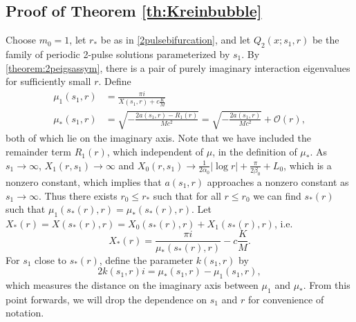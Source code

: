 \documentclass[10pt,reqno]{amsart}
\theoremstyle{plain}
\theoremstyle{definition}
\theoremstyle{remark}
\numberwithin{theorem}{section}
\numberwithin{equation}{section}
\begin{document}
\subsection{Proof of Theorem \ref{th:Kreinbubble}}

Choose $m_0 = 1$, let $r_*$ be as in \cref{2pulsebifurcation}, and let $Q_2(x; s_1, r)$ be the family of periodic 2-pulse solutions parameterized by $s_1$. By \cref{theorem:2peigsassym}, there is a pair of purely imaginary interaction eigenvalues for sufficiently small $r$. Define
\begin{align*}
\mu_1(s_1, r) &= \frac{\pi i}{X(s_1,r) + c \frac{K}{M}} \\
\mu_*(s_1, r) &= \sqrt{-\frac{ 2a(s_1,r) - R_1(r) }{M c^2}} = \sqrt{-\frac{2a(s_1,r)}{M c^2}} + \mathcal{O}(r),
\end{align*}
both of which lie on the imaginary axis. Note that we have included the remainder term $R_1(r)$, which independent of $\mu$, in the definition of $\mu_*$. As $s_1 \rightarrow \infty$, $X_1(r, s_1) \rightarrow \infty$ and $X_0(r, s_1) \rightarrow \frac{1}{2 \alpha_0}|\log r| + \frac{\pi}{2\beta_0} + L_0$, which is a nonzero constant, which implies that $a(s_1,r)$ approaches a nonzero constant as $s_1 \rightarrow \infty$. Thus there exists $r_0 \leq r_*$ such that for all $r \leq r_0$ we can find $s_*(r)$ such that $\mu_1(s_*(r), r) = \mu_*(s_*(r), r)$. Let $X_*(r) = X(s_*(r), r) = X_0(s_*(r), r) + X_1(s_*(r), r)$, i.e.
\begin{equation}\label{XstarKrein}
X_*(r) = \frac{\pi i}{\mu_*(s_*(r), r)} - c \frac{K}{M}.
\end{equation}
For $s_1$ close to $s_*(r)$, define the parameter $k(s_1, r)$ by 
\[
2 k(s_1, r) i = \mu_*(s_1, r) - \mu_1(s_1, r),
\]
which measures the distance on the imaginary axis between $\mu_1$ and $\mu_*$. From this point forwards, we will drop the dependence on $s_1$ and $r$ for convenience of notation.
\end{document}
